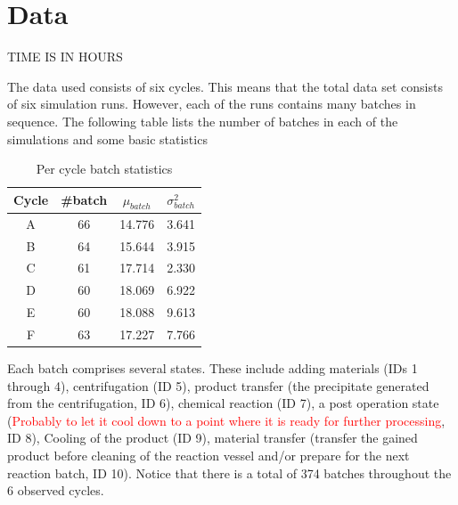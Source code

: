 \documentclass[../Thesis.tex]{subfiles}
\begin{document}
\chapter{Data}
TIME IS IN HOURS

The data used consists of six cycles. This means that the total data set consists of six simulation runs. However, each of the runs contains many batches in sequence. The following table lists the number of batches in each of the simulations and some basic statistics

\begin{table}[h]
    \centering
    \begin{tabular}{c|c|c|c}
        Cycle & \#batch & $\mu_{batch}$ & $\sigma^2_{batch}$\\ \hline
        A & 66 & 14.776 & 3.641\\
        B & 64 & 15.644 & 3.915\\
        C & 61 & 17.714 & 2.330\\
        D & 60 & 18.069 & 6.922\\
        E & 60 & 18.088 & 9.613\\
        F & 63 & 17.227 & 7.766
    \end{tabular}
    \caption{Per cycle batch statistics}
    \label{tab:cycle basi stats}
\end{table}

Each batch comprises several states. These include adding materials (IDs 1 through 4), centrifugation (ID 5), product transfer (the precipitate generated from the centrifugation, ID 6), chemical reaction (ID 7), a post operation state (\textcolor{red}{Probably to let it cool down to a point where it is ready for further processing}, ID 8), Cooling of the product (ID 9), material transfer (transfer the gained product before cleaning of the reaction vessel and/or prepare for the next reaction batch, ID 10). Notice that there is a total of 374 batches throughout the 6 observed cycles.
\end{document}
